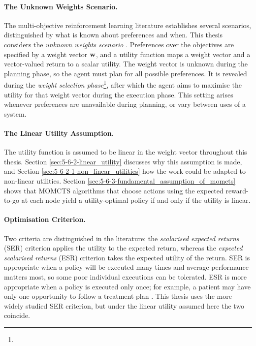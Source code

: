     \paragraph{The Unknown Weights Scenario.} The multi-objective reinforcement learning literature establishes several scenarios, distinguished by what is known about preferences and when. This thesis considers the \textit{unknown weights scenario} \cite{survey_mo_seq_dec_make,morl_survey}. Preferences over the objectives are specified by a weight vector $\mathbf{w}$, and a utility function maps a weight vector and a vector-valued return to a scalar utility. The weight vector is unknown during the planning phase, so the agent must plan for all possible preferences. It is revealed during the \textit{weight selection phase}\footnote{}, after which the agent aims to maximise the utility for that weight vector during the execution phase. This setting arises whenever preferences are unavailable during planning, or vary between uses of a system.

    \paragraph{The Linear Utility Assumption.} The utility function is assumed to be linear in the weight vector throughout this thesis. Section \ref{sec:5-6-2-linear_utility} discusses why this assumption is made, and Section \ref{sec:5-6-2-1-non_linear_utilities} how the work could be adapted to non-linear utilities. Section \ref{sec:5-6-3-fundamental_assumption_of_momcts} shows that MOMCTS algorithms that choose actions using the expected reward-to-go at each node yield a utility-optimal policy if and only if the utility is linear.

    \paragraph{Optimisation Criterion.} Two criteria are distinguished in the literature: the \textit{scalarised expected returns} (SER) criterion applies the utility to the expected return, whereas the \textit{expected scalarised returns} (ESR) criterion takes the expected utility of the return. SER is appropriate when a policy will be executed many times and average performance matters most, so some poor individual executions can be tolerated. ESR is more appropriate when a policy is executed only once; for example, a patient may have only one opportunity to follow a treatment plan \cite{morl_survey,survey_mo_seq_dec_make}. This thesis uses the more widely studied SER criterion, but under the linear utility assumed here the two coincide. 

